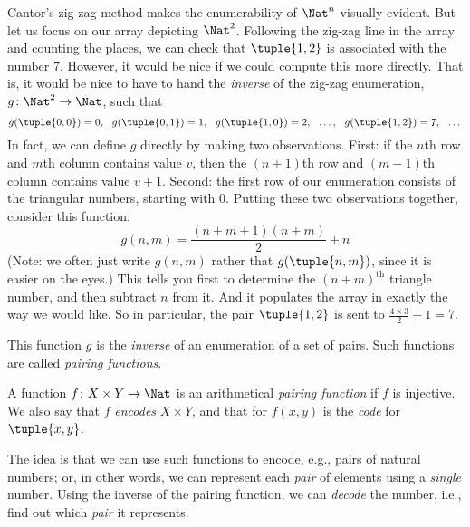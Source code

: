 \documentclass[../../../include/open-logic-section]{subfiles}
\begin{document}
\begin{explain}
Cantor's zig-zag method makes the enumerability of $\Nat^n$ visually evident. But let us focus on our array depicting $\Nat^2$. Following the zig-zag line in the array and counting the places, we can check that $\tuple{1,2}$ is associated with the number 7. However, it would be nice if we could compute this more directly. That is, it would be nice to have to hand the \emph{inverse} of the zig-zag enumeration, $g\colon \Nat^2 \to \Nat$, such that
\[
g(\tuple{0,0}) = 0, \ \ g(\tuple{0,1}) = 1, \ \ g(\tuple{1,0}) = 2, \ \ \dots, \ \ g(\tuple{1,2}) = 7, \ \ \dots
\]
In fact, we can define $g$ directly by making two observations. First: if the $n$th row and $m$th column contains value $v$, then the $(n+1)$th row and $(m-1)$th column contains value $v + 1$. Second: the first row of our enumeration consists of the triangular numbers, starting with $0$. Putting these two observations together, consider this function:
$$g(n,m) = \frac{(n+m+1)(n+m)}{2} + n$$
(Note: we often just write $g(n, m)$ rather that $g(\tuple{n, m})$, since it is easier on the eyes.) This tells you first to determine the $(n+m)^\text{th}$ triangle number, and then subtract $n$ from it. And it populates the array in exactly the way we would like. So in particular, the pair $\tuple{1, 2}$ is sent to $\frac{4 \times 3}{2} + 1 = 7$. 

This function $g$ is the \emph{inverse} of an enumeration of a set of pairs. Such functions are called \emph{pairing functions}.
\end{explain}
\begin{defn}
	A function $f\colon X \times Y \to \Nat$ is an arithmetical \emph{pairing function} if $f$ is injective. We also say that $f$ \emph{encodes} $X \times Y$, and that for $f(x,y)$ is the \emph{code} for $\tuple{x,y}$.
\end{defn}
\begin{explain}
The idea is that we can use such functions to encode, e.g., pairs of natural numbers; or, in other words, we can represent each \emph{pair} of elements using a \emph{single} number. Using the inverse of the pairing function, we can \emph{decode} the number, i.e., find out which \emph{pair} it represents.
\end{explain}
%
\end{document}
